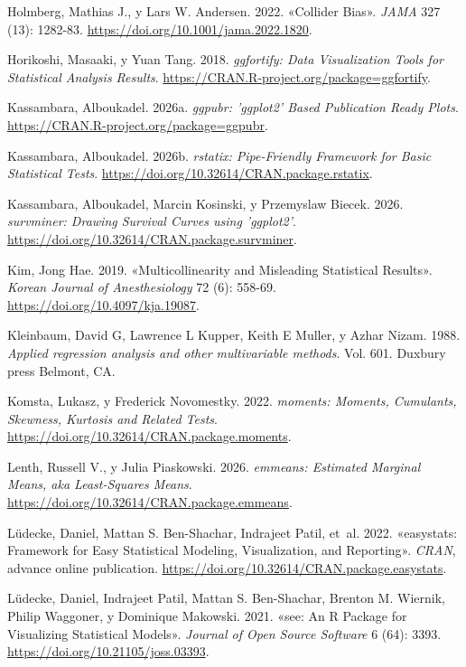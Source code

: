\documentclass[
  spanish,
  a4paper,
]{scrbook}
\newlength{\cslhangindent}
\newenvironment{CSLReferences}[2] %
 {\begin{list}{}{%
  \setlength{\itemindent}{0pt}
  \setlength{\leftmargin}{0pt}
  \setlength{\parsep}{0pt}
  \ifodd #1
   \setlength{\leftmargin}{\cslhangindent}
   \setlength{\itemindent}{-1\cslhangindent}
  \fi
  \setlength{\itemsep}{#2\baselineskip}}}
 {\end{list}}
\begin{document}
\begin{CSLReferences}{1}{1}
Holmberg, Mathias J., y Lars W. Andersen. 2022. {«Collider Bias»}.
\emph{JAMA} 327 (13): 1282-83.
\url{https://doi.org/10.1001/jama.2022.1820}.

Horikoshi, Masaaki, y Yuan Tang. 2018. \emph{ggfortify: Data
Visualization Tools for Statistical Analysis Results}.
\url{https://CRAN.R-project.org/package=ggfortify}.

Kassambara, Alboukadel. 2026a. \emph{ggpubr: 'ggplot2' Based Publication
Ready Plots}. \url{https://CRAN.R-project.org/package=ggpubr}.

Kassambara, Alboukadel. 2026b. \emph{rstatix: Pipe-Friendly Framework
for Basic Statistical Tests}.
\url{https://doi.org/10.32614/CRAN.package.rstatix}.

Kassambara, Alboukadel, Marcin Kosinski, y Przemyslaw Biecek. 2026.
\emph{survminer: Drawing Survival Curves using 'ggplot2'}.
\url{https://doi.org/10.32614/CRAN.package.survminer}.

Kim, Jong Hae. 2019. {«Multicollinearity and Misleading Statistical
Results»}. \emph{Korean Journal of Anesthesiology} 72 (6): 558-69.
\url{https://doi.org/10.4097/kja.19087}.

Kleinbaum, David G, Lawrence L Kupper, Keith E Muller, y Azhar Nizam.
1988. \emph{Applied regression analysis and other multivariable
methods}. Vol. 601. Duxbury press Belmont, CA.

Komsta, Lukasz, y Frederick Novomestky. 2022. \emph{moments: Moments,
Cumulants, Skewness, Kurtosis and Related Tests}.
\url{https://doi.org/10.32614/CRAN.package.moments}.

Lenth, Russell V., y Julia Piaskowski. 2026. \emph{emmeans: Estimated
Marginal Means, aka Least-Squares Means}.
\url{https://doi.org/10.32614/CRAN.package.emmeans}.

Lüdecke, Daniel, Mattan S. Ben-Shachar, Indrajeet Patil, et~al. 2022.
{«easystats: Framework for Easy Statistical Modeling, Visualization, and
Reporting»}. \emph{CRAN}, advance online publication.
\url{https://doi.org/10.32614/CRAN.package.easystats}.

Lüdecke, Daniel, Indrajeet Patil, Mattan S. Ben-Shachar, Brenton M.
Wiernik, Philip Waggoner, y Dominique Makowski. 2021. {«{see}: An {R}
Package for Visualizing Statistical Models»}. \emph{Journal of Open
Source Software} 6 (64): 3393.
\url{https://doi.org/10.21105/joss.03393}.


\end{CSLReferences}
\end{document}
